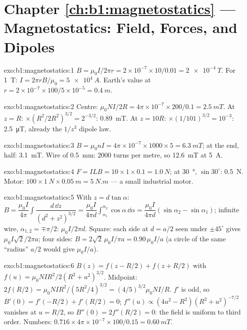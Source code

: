 \section*{Chapter \ref{ch:b1:magnetostatics} --- Magnetostatics: Field, Forces, and Dipoles}

\begin{solution}{exo:b1:magnetostatics:1}
$B = \mu_0I/2\pi r = 2 \times 10^{-7} \times 10/0.01 = \qty{2e-4}{T}$. For \qty{1}{T}:
$I = 2\pi rB/\mu_0 = \qty{5e4}{A}$. Earth's value at $r = 2 \times 10^{-7} \times
100/5 \times 10^{-5} = \qty{0.4}{m}$.
\end{solution}

\begin{solution}{exo:b1:magnetostatics:2}
Centre: $\mu_0NI/2R = 4\pi \times 10^{-7} \times 200/0.1 = \qty{2.5}{mT}$. At $z = R$:
$\times(R^2/2R^2)^{3/2} = 2^{-3/2}$: \qty{0.89}{mT}. At $z = 10R$: $\times(1/101)^{3/2}
= 10^{-3}$: \qty{2.5}{\micro T}, already the $1/z^3$ dipole law.
\end{solution}

\begin{solution}{exo:b1:magnetostatics:3}
$B = \mu_0nI = 4\pi \times 10^{-7} \times 1000 \times 5 = \qty{6.3}{mT}$; at the end,
half: \qty{3.1}{mT}. Wire of \qty{0.5}{mm}: $2000$ turns per metre, so
\qty{12.6}{mT} at \qty{5}{A}.
\end{solution}

\begin{solution}{exo:b1:magnetostatics:4}
$F = ILB = 10 \times 1 \times 0.1 = \qty{1.0}{N}$; at \qty{30}{\degree}, $\sin30^\circ$:
\qty{0.5}{N}. Motor: $100 \times \qty{1}{N} \times \qty{0.05}{m} = \qty{5}{N.m}$ ---
a small industrial motor.
\end{solution}

\begin{solution}{exo:b1:magnetostatics:5}
With $z = d\tan\alpha$: $B = \dfrac{\mu_0I}{4\pi}\displaystyle\int\dfrac{d\,\dd z}{(d^2 + z^2)^{3/2}}
= \dfrac{\mu_0I}{4\pi d}\displaystyle\int_{\alpha_1}^{\alpha_2}\cos\alpha\,\dd\alpha = \dfrac{\mu_0I}{4\pi d}
(\sin\alpha_2 - \sin\alpha_1)$; infinite wire, $\alpha_{1,2} = \mp\pi/2$: $\mu_0I/2\pi d$.
Square: each side at $d = a/2$ seen under $\pm45^\circ$ gives $\mu_0I\sqrt2/2\pi a$;
four sides: $B = 2\sqrt2\,\mu_0I/\pi a = 0.90\,\mu_0I/a$ (a circle of the same
``radius'' $a/2$ would give $\mu_0I/a$).
\end{solution}

\begin{solution}{exo:b1:magnetostatics:6}
$B(z) = f(z - R/2) + f(z + R/2)$ with $f(u) = \mu_0NIR^2/2(R^2 + u^2)^{3/2}$.
Midpoint: $2f(R/2) = \mu_0NIR^2/(5R^2/4)^{3/2} = (4/5)^{3/2}\mu_0NI/R$. $f'$ is
odd, so $B'(0) = f'(-R/2) + f'(R/2) = 0$; $f''(u) \propto (4u^2 - R^2)(R^2 +
u^2)^{-7/2}$ vanishes at $u = R/2$, so $B''(0) = 2f''(R/2) = 0$: the field is
uniform to third order. Numbers: $0.716 \times 4\pi \times 10^{-7} \times 100/0.15 =
\qty{0.60}{mT}$.
\end{solution}

